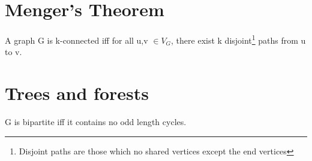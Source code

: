\documentclass{article}
\begin{document}

\section{Menger's Theorem}
\begin{theorem}
    A graph G is k-connected iff for all u,v $\in V_{G}$, there exist k disjoint\footnote{Disjoint paths are those which no shared vertices except the end vertices} paths from u to v.
\end{theorem}

\section{Trees and forests}
\begin{theorem}
    G is bipartite iff it contains no odd length cycles.
\end{theorem}
\end{document}
